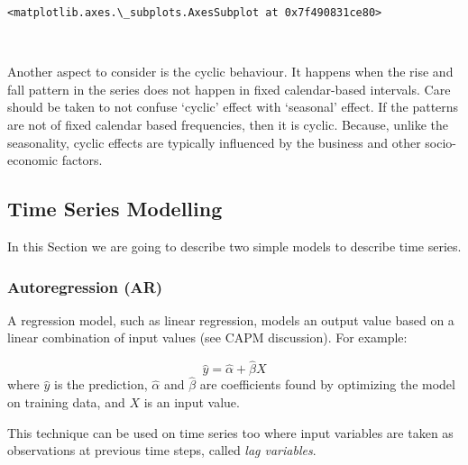 \documentclass[11pt]{article}
\makeatletter
\newcommand{\boxspacing}{\kern\kvtcb@left@rule\kern\kvtcb@boxsep}
\newcommand{\prompt}[4]{
        \ttfamily\llap{{\color{#2}[#3]:\hspace{3pt}#4}}\vspace{-\baselineskip}
    }
\makeatother
\begin{document}
            \begin{tcolorbox}[breakable, size=fbox, boxrule=.5pt, pad at break*=1mm, opacityfill=0]
\prompt{Out}{outcolor}{5}{\boxspacing}
\begin{Verbatim}[commandchars=\\\{\}]
<matplotlib.axes.\_subplots.AxesSubplot at 0x7f490831ce80>
\end{Verbatim}
\end{tcolorbox}
        
    \begin{center}
    \end{center}
    { \hspace*{\fill} \\}
    
    Another aspect to consider is the cyclic behaviour. It happens when the
rise and fall pattern in the series does not happen in fixed
calendar-based intervals. Care should be taken to not confuse `cyclic'
effect with `seasonal' effect. If the patterns are not of fixed calendar
based frequencies, then it is cyclic. Because, unlike the seasonality,
cyclic effects are typically influenced by the business and other
socio-economic factors.

    \hypertarget{time-series-modelling}{%
\subsection{Time Series Modelling}\label{time-series-modelling}}

In this Section we are going to describe two simple models to describe
time series.

\hypertarget{autoregression-ar}{%
\subsubsection{Autoregression (AR)}\label{autoregression-ar}}

A regression model, such as linear regression, models an output value
based on a linear combination of input values (see CAPM discussion). For
example:

\[\hat{y} = \hat{\alpha} + \hat{\beta}X\] where \(\hat{y}\) is the
prediction, \(\hat{\alpha}\) and \(\hat{\beta}\) are coefficients found
by optimizing the model on training data, and \(X\) is an input value.

This technique can be used on time series too where input variables are
taken as observations at previous time steps, called
\emph{lag variables}.
\end{document}

